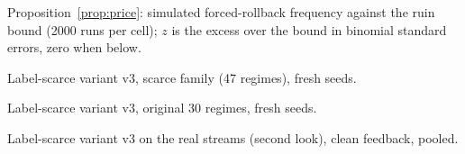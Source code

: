 \documentclass{article}
\theoremstyle{plain}
\theoremstyle{definition}
\begin{document}
\begin{table}[h]\caption{Proposition~\ref{prop:price}: simulated forced-rollback frequency against the ruin bound (2000 runs per cell); $z$ is the excess over the bound in binomial standard errors, zero when below.}\label{tab:prop4}\centering\small\end{table}
\begin{table}[h]\caption{Label-scarce variant v3, scarce family (47 regimes), fresh seeds.}\label{tab:v3s}\centering\scriptsize\end{table}
\begin{table}[h]\caption{Label-scarce variant v3, original 30 regimes, fresh seeds.}\label{tab:v3o}\centering\scriptsize\end{table}
\begin{table}[h]\caption{Label-scarce variant v3 on the real streams (second look), clean feedback, pooled.}\label{tab:v3r}\centering\scriptsize\end{table}
\end{document}
